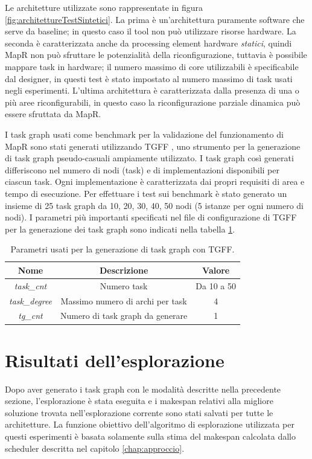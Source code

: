 Le architetture utilizzate
sono rappresentate in figura \ref{fig:architettureTestSintetici}. La prima \`e un'architettura puramente
software che serve da baseline; in questo caso il tool non pu\`o utilizzare risorse hardware.
La seconda \`e caratterizzata anche da processing element hardware \emph{statici}, quindi MapR non pu\`o
sfruttare le potenzialit\`a della riconfigurazione, tuttavia \`e possibile mappare task in hardware;
il numero massimo di core utilizzabili \`e specificabile dal designer, in questi test
\`e stato impostato al numero massimo di task usati negli esperimenti.
L'ultima architettura \`e caratterizzata dalla presenza di una o pi\`u aree riconfigurabili, in questo
caso la riconfigurazione parziale dinamica pu\`o essere sfruttata da MapR.


I task graph usati come benchmark per la validazione del funzionamento di
\mbox{MapR} sono stati generati utilizzando \ac{TGFF} \cite{tgff}, uno strumento per
la generazione di task graph pseudo-casuali ampiamente utilizzato.
I task graph cos\`i generati differiscono nel numero di nodi (task) e di implementazioni
disponibili per ciascun task. Ogni implementazione \`e caratterizzata dai propri requisiti
di area e tempo di esecuzione. Per effettuare i test sui benchmark \`e stato generato un insieme di 25 task graph da
10, 20, 30, 40, 50 nodi (5 istanze per ogni numero di nodi). I parametri pi\`u importanti specificati
nel file di configurazione di \ac{TGFF} per la generazione dei task graph sono indicati nella tabella
\ref{tab:parametriTGFF}.

\begin{table}[t]
  \begin{center}
  \begin{tabular}{|c|c|c|}
    \hline
    \textbf{Nome} & \textbf{Descrizione} & \textbf{Valore}\\
    \hline
    \emph{task\_cnt} & Numero task & Da 10 a 50\\
    \hline
    \emph{task\_degree} & Massimo numero di archi per task & 4\\
    \hline
    \emph{tg\_cnt} & Numero di task graph da generare & 1\\
    \hline
  \end{tabular}
  \caption{Parametri usati per la generazione di task graph con \acs{TGFF}.}
  \label{tab:parametriTGFF}
\end{center}
\end{table}


\section{Risultati dell'esplorazione}
\label{sec:risultatiEsplorazione}
Dopo aver generato i task graph con le modalit\`a descritte nella precedente
sezione, l'esplorazione \`e stata eseguita e i makespan relativi alla migliore soluzione
trovata nell'esplorazione corrente sono stati salvati per tutte le architetture.
La funzione obiettivo dell'algoritmo di esplorazione utilizzata per questi esperimenti
\`e basata solamente sulla stima del makespan calcolata dallo scheduler descritta nel
capitolo \ref{chap:approccio}.

